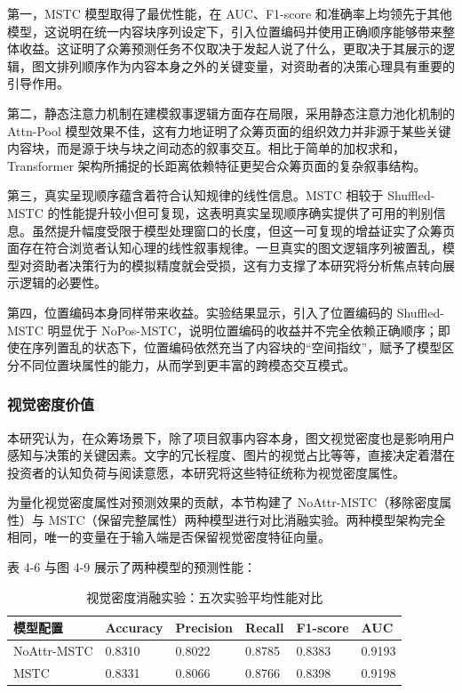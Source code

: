 第一，MSTC 模型取得了最优性能，在 AUC、F1-score 和准确率上均领先于其他模型，这说明在统一内容块序列设定下，引入位置编码并使用正确顺序能够带来整体收益。这证明了众筹预测任务不仅取决于发起人说了什么，更取决于其展示的逻辑，图文排列顺序作为内容本身之外的关键变量，对资助者的决策心理具有重要的引导作用。

第二，静态注意力机制在建模叙事逻辑方面存在局限，采用静态注意力池化机制的 Attn-Pool 模型效果不佳，这有力地证明了众筹页面的组织效力并非源于某些关键内容块，而是源于块与块之间动态的叙事交互。相比于简单的加权求和，Transformer 架构所捕捉的长距离依赖特征更契合众筹页面的复杂叙事结构。

第三，真实呈现顺序蕴含着符合认知规律的线性信息。MSTC 相较于 Shuffled-MSTC 的性能提升较小但可复现，这表明真实呈现顺序确实提供了可用的判别信息。虽然提升幅度受限于模型处理窗口的长度，但这一可复现的增益证实了众筹页面存在符合浏览者认知心理的线性叙事规律。一旦真实的图文逻辑序列被置乱，模型对资助者决策行为的模拟精度就会受损，这有力支撑了本研究将分析焦点转向展示逻辑的必要性。

第四，位置编码本身同样带来收益。实验结果显示，引入了位置编码的 Shuffled-MSTC 明显优于 NoPos-MSTC，说明位置编码的收益并不完全依赖正确顺序；即使在序列置乱的状态下，位置编码依然充当了内容块的“空间指纹”，赋予了模型区分不同位置块属性的能力，从而学到更丰富的跨模态交互模式。

\subsubsection{视觉密度价值}
本研究认为，在众筹场景下，除了项目叙事内容本身，图文视觉密度也是影响用户感知与决策的关键因素。文字的冗长程度、图片的视觉占比等等，直接决定着潜在投资者的认知负荷与阅读意愿，本研究将这些特征统称为视觉密度属性。

为量化视觉密度属性对预测效果的贡献，本节构建了 NoAttr-MSTC（移除密度属性）与 MSTC（保留完整属性）两种模型进行对比消融实验。两种模型架构完全相同，唯一的变量在于输入端是否保留视觉密度特征向量。

表 4-6 与图 4-9 展示了两种模型的预测性能：


\begin{table}[H]
\centering
\caption{视觉密度消融实验：五次实验平均性能对比}
\label{tab:exp4_6}
\begin{tabular}{@{}llllll@{}}
\toprule
\textbf{模型配置} & \textbf{Accuracy} & \textbf{Precision} & \textbf{Recall} & \textbf{F1-score} & \textbf{AUC} \\ \midrule
NoAttr-MSTC & 0.8310 & 0.8022 & 0.8785 & 0.8383 & 0.9193 \\
MSTC & 0.8331 & 0.8066 & 0.8766 & 0.8398 & 0.9198 \\ \bottomrule
\end{tabular}
\end{table}



